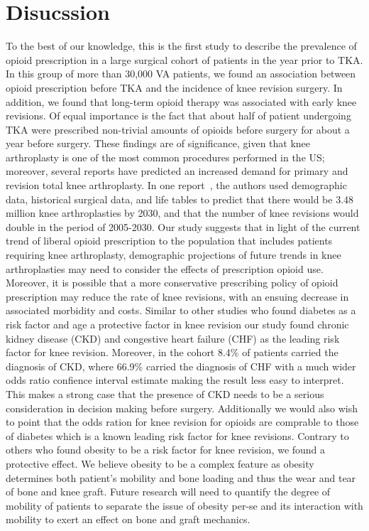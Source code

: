 \documentclass[a4paper]{article}
\begin{document}
\section*{Disucssion}
To the best of our knowledge, this is the first study to describe the prevalence of opioid prescription in a large surgical cohort of patients in the year prior to TKA. In this group of more than 30,000 VA patients, we found an association between opioid prescription before TKA and the incidence of knee revision surgery. In addition, we found that long-term opioid therapy was associated with early knee revisions. Of equal importance is the fact that about half of patient undergoing TKA were prescribed non-trivial amounts of  opioids before surgery for about a year before surgery. \newline
\indent These findings are of significance, given that knee arthroplasty is one of the most common procedures performed in the US; moreover, several reports have predicted an increased demand for primary and revision total knee arthroplasty. In one report~\cite{pmid17403800}, the authors used demographic data, historical surgical data, and life tables to predict that there would be 3.48 million knee arthroplasties by 2030, and that the number of knee revisions would double in the period of 2005-2030. Our study suggests that in light of the current trend of liberal opioid prescription to the population that includes patients requiring knee arthroplasty, demographic projections of future trends in knee arthroplasties may need to consider the effects of prescription opioid use. Moreover, it is possible that a more conservative prescribing policy of opioid prescription may reduce the rate of knee revisions, with an ensuing decrease in associated morbidity and costs. \newline Similar to other studies who found diabetes as a risk factor and age a protective factor in knee revision our study found chronic kidney disease (CKD) and congestive heart failure (CHF) as the leading risk factor for knee revision. Moreover, in the cohort 8.4\% of patients carried the diagnosis of CKD, where 66.9\% carried the diagnosis of CHF with a much wider odds ratio confience interval estimate making the result less easy to interpret. This makes a strong case that the presence of CKD needs to be a serious consideration in decision making before surgery. Additionally we would also wish to point that the odds ration for knee revision for opioids are comprable to those of diabetes which is a known leading risk factor for knee revisions. Contrary to others who found obesity to be a risk factor for knee revision, we found a protective effect. We believe obesity to be a complex feature as obesity determines both patient's mobility and bone loading and thus the wear and tear of bone and knee graft. Future research will need to quantify the degree of mobility of patients to separate the issue of obesity per-se and its interaction with mobility to exert an effect on bone and graft mechanics.\newline
\end{document}
